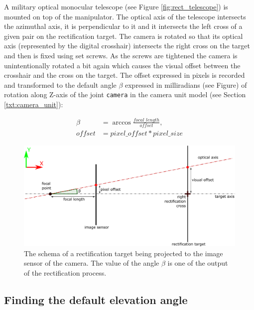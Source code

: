 A military optical monocular telescope (see Figure \ref{fig:rect_telescope}) is mounted on top of the manipulator. The optical axis of the telescope intersects the azimuthal axis, it is perpendicular to it and it intersects the left cross of a given pair on the rectification target. The camera is rotated so that its optical axis (represented by the digital crosshair) intersects the right cross on the target and then is fixed using set screws. As the screws are tightened the camera is unintentionally rotated a bit again which causes the visual offset between the crosshair and the cross on the target. The offset expressed in pixels is recorded and transformed to the default angle $\beta$ expressed in milliradians (see Figure) of rotation along Z-axis of the joint \texttt{camera} in the camera unit model (see Section \ref{txt:camera_unit}):

\begin{equation*}
\begin{aligned}
\beta &= \arccos\frac{focal\_length}{offset}, \\
offset &= pixel\_offset * pixel\_size
\end{aligned}
\end{equation*}

\begin{figure}[htb]
	\centering
	\includegraphics[width=13cm]{fig/rect_pixel_offset.pdf}
	\caption{The schema of a rectification target being projected to the image sensor of the camera. The value of the angle $\beta$ is one of the output of the rectification process.}
	\label{fig:rect_pixel_offset}
\end{figure}

\subsection{Finding the default elevation angle}




